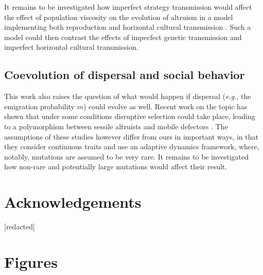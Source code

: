 \documentclass[11pt, letterpaper]{article}
\newcommand{\eg}{\textit{e.g.}}
\begin{document}
It remains to be investigated how imperfect strategy transmission would affect the effect of population viscosity on the evolution of altruism in a model implementing both reproduction and horizontal cultural transmission \citep[as in][]{Lehmann2008}. Such a model could then contrast the effects of impecfect genetic transmission and imperfect horizontal cultural transmission. 



\subsection*{Coevolution of dispersal and social behavior}
This work also raises the question of what would happen if dispersal (\eg, the emigration probability $m$) could evolve as well. Recent work on the topic has shown that under some conditions disruptive selection could take place, leading to a polymorphism between sessile altruists and mobile defectors \citep{Parvinen2013, MullonKL2017bioRxiv}. The assumptions of these studies however  differ from ours in important ways, in that they consider continuous traits and use an adaptive dynamics framework, where, notably, mutations are assumed to be very rare. It remains to be investigated how non-rare and potentially large mutations would affect their result. 

\section*{Acknowledgements}
[redacted]

\singlespacing
\clearpage


\doublespacing



\clearpage
\setcounter{figure}{0}
\section*{Figures}



\end{document}
